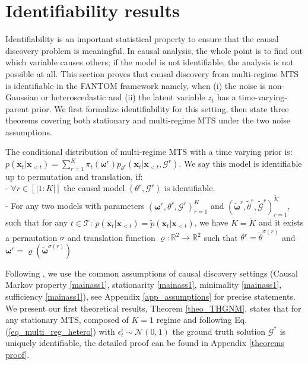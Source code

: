 \section{Identifiability results}
Identifiability is an important statistical property to ensure that the causal discovery problem is meaningful. In causal analysis, the whole point is to find out which variable causes others; if the model is not identifiable, the analysis is not possible at all. This section proves that causal discovery from multi-regime MTS is identifiable in the FANTOM framework namely, when (i) the noise is non-Gaussian or heteroscedastic and (ii) the latent variable $z_t$ has a time-varying-parent prior. We first formalize identifiability for this setting, then state three theorems covering both stationary and multi-regime MTS under the two noise assumptions. 
\begin{mybox}
\begin{definition}
The conditional distribution of multi-regime MTS with a time varying prior is: $p(\boldsymbol{x}_t|\boldsymbol{x}_{<t}) =  \sum_{r=1}^K\pi_t(\boldsymbol{\omega}^r)p_{\theta^r}(\boldsymbol{x}_t|\boldsymbol{x}_{<t},\mathcal{G}^r)$. We say this model is identifiable up to permutation and translation, if:\\
- $\forall r \in [|1:K|]$ the causal model $(\theta^r,\mathcal{G}^r)$ is identifiable.\\
- For any two models with parameters $(\boldsymbol{\omega}^r,\theta^r,\mathcal{G}^r)_{r=1}^K$ and $(\tilde{\boldsymbol{\omega}}^r,\tilde{\theta}^r,\tilde{\mathcal{G}}^r)_{r=1}^{\tilde{K}}$, such that for any $t \in \mathcal{T}$: $p(\boldsymbol{x}_t|\boldsymbol{x}_{<t}) = \tilde{p}(\boldsymbol{x}_t|\boldsymbol{x}_{<t})$, we have $K=\tilde{K}$ and it exists a permutation $\sigma$ and translation function $\varrho: \mathbb{R}^2 \rightarrow \mathbb{R}^2$ such that $\theta^r =\tilde{\theta}^{\sigma(r)}$ and $\boldsymbol{\omega}^r = \varrho(\tilde{\boldsymbol{\omega}}^{\sigma(r)})$
\label{def_identifia}
\end{definition}
\end{mybox}
Following \citep{gong2022rhino, rahmanicausal, brouillard2020differentiable}, we use the common assumptions of causal discovery settings (Causal Markov property \ref{mainass1}, stationarity \ref{mainass1}, minimality \ref{mainass1}, sufficiency \ref{mainass1}), see Appendix \ref{app_assumptions} for precise statements. We present our first theoretical results, Theorem \ref{theo_THGNM}, states that for any stationary MTS, composed of $K=1$ regime and following Eq.(\ref{eq_multi_reg_hetero}) with $\epsilon^{i}_t \sim \mathcal{N}(0,1)$ the ground truth solution $\mathcal{G}^*$ is uniquely identifiable, the detailed proof can be found in Appendix \ref{theorems proof}.
